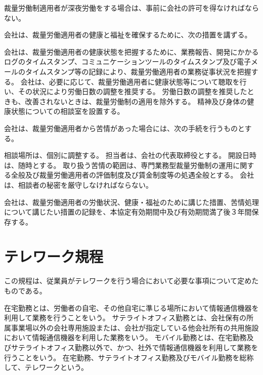 \documentclass[10pt,a4paper]{jsarticle}
\begin{document}
裁量労働制適用者が深夜労働をする場合は、事前に会社の許可を得なければならない。

会社は、裁量労働適用者の健康と福祉を確保するために、次の措置を講ずる。
\begin{enumerate}
    \itm 会社は、裁量労働適用者の健康状態を把握するために、業務報告、開発にかかるログのタイムスタンプ、コミュニケーションツールのタイムスタンプ及び電子メールのタイムスタンプ等の記録により、裁量労働適用者の業務従事状況を把握する。
    \itm 会社は、必要に応じて、裁量労働適用者に健康状態等について聴取を行い、その状況により労働日数の調整を推奨する。
    \itm 労働日数の調整を推奨したときも、改善されないときは、裁量労働制の適用を除外する。
    \itm 精神及び身体の健康状態についての相談室を設置する。
\end{enumerate}

会社は、裁量労働適用者から苦情があった場合には、次の手続を行うものとする。
\begin{enumerate}
    \itm 相談場所は、個別に調整する。
    \itm 担当者は、会社の代表取締役とする。
    \itm 開設日時は、随時とする。
    \itm 取り扱う苦情の範囲は、専門業務型裁量労働制の運用に関する全般及び裁量労働適用者の評価制度及び賃金制度等の処遇全般とする。
    \itm 会社は、相談者の秘密を厳守しなければならない。
\end{enumerate}

会社は、裁量労働適用者の労働状況、健康・福祉のために講じた措置、苦情処理について講じたい措置の記録を、本協定有効期間中及び有効期間満了後３年間保存する。








\clearpage
\section{テレワーク規程}

この規程は、従業員がテレワークを行う場合において必要な事項について定めたものである。

在宅勤務とは、労働者の自宅、その他自宅に準じる場所において情報通信機器を利用して業務を行うことをいう。
\term サテライトオフィス勤務とは、会社保有の所属事業場以外の会社専用施設または、会社が指定している他会社所有の共用施設において情報通信機器を利用した業務をいう。
\term モバイル勤務とは、在宅勤務及びサテライトオフィス勤務以外で、かつ、社外で情報通信機器を利用して業務を行うことをいう。
\term 在宅勤務、サテライトオフィス勤務及びモバイル勤務を総称して、テレワークという。
\end{document}
